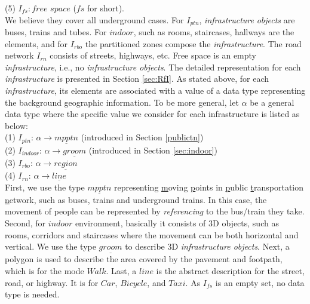(5) $I_{fs}:free$ $space$ ($fs$ for short). \\

We believe they cover all underground cases. For $I_{ptn}$, \textit{infrastructure} 
\textit{objects} are buses, trains and tubes. For $indoor$, such as rooms, staircases, hallways are the elements, and for $I_{rbo}$ the partitioned 
zones compose the \textit{infrastructure}. The road network $I_{rn}$ consists of streets, highways, 
etc. Free space is an empty \textit{infrastructure}, i.e., no \textit{infrastructure objects}. The detailed representation for each \textit{infrastructure} is presented in Section \ref{sec:RfI}. 
As stated above, for each \textit{infrastructure}, its elements are associated with a value of a data type representing the background geographic information. To be more general, let $\alpha$ be a general data type where the specific value we consider for each infrastructure is listed as below: \\

(1) $I_{ptn}$: $\alpha \rightarrow \underline{mpptn}$ (introduced in Section \ref{publictn}) \\

(2) $I_{indoor}$: $\alpha \rightarrow \underline{groom}$ (introduced in Section \ref{sec:indoor}) \\

(3) $I_{rbo}$: $\alpha \rightarrow \underline{region}$ \\

(4) $I_{rn}$: $\alpha \rightarrow \underline{line}$ \\

First, we use the type $\underline{mpptn}$ representing \underline{m}oving \underline{p}oints in \underline{p}ublic \underline{t}ransportation \underline{n}etwork, 
such as buses, trains and underground trains. In this case, 
the movement of people can be represented by \textit{referencing} to the bus/train they take. 
Second, for $indoor$ environment, basically it consists of 3D objects, such as rooms, 
corridors and staircases where the movement can be both horizontal and vertical. 
We use the type $\underline{groom}$ to describe 3D \textit{infrastructure objects}.
Next, a polygon is used to describe the area covered by the pavement and footpath, 
which is for the mode $Walk$. Last, a $line$ is the abstract description for the street, 
road, or highway. It is for $Car$, $Bicycle$, and $Taxi$. As $I_{fs}$ is an empty set, no data type
is needed.  \\

